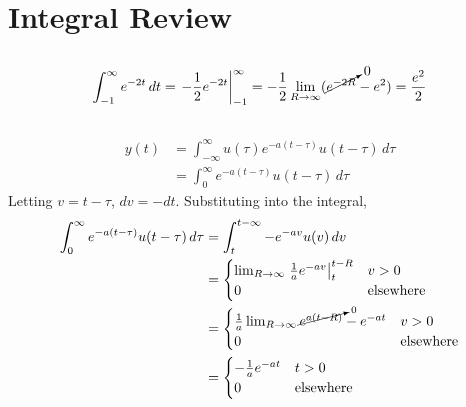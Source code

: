 \documentclass{article}
\begin{document}
\section{Integral Review}

\subsection{}

\begin{equation}
    \int_{-1}^\infty e^{-2t} \, dt = \left.-\frac{1}{2} e^{-2t}\right|_{-1}^\infty = -\frac{1}{2} \lim_{R \to \infty} (\cancelto{0}{e^{-2R}} - e^2) = \frac{e^2}{2}
\end{equation}

\subsection{}

\begin{align}
    y(t) &= \int_{-\infty}^\infty u(\tau) e^{-a (t - \tau)} u(t - \tau) \, d\tau \\
    &= \int_0^\infty e^{-a (t - \tau)} u(t - \tau) \, d\tau
\end{align}
Letting \(v = t - \tau\), \(dv = -dt\).
Substituting into the integral,
\begin{align}
    \int_0^\infty e^{-a (t - \tau)} u(t - \tau) \, d\tau &= \int_t^{t - \infty} -e^{-a v} u(v) \, dv \\
    &=
    \begin{cases}
        \lim_{R \to \infty} \left.\frac{1}{a} e^{-a v}\right|_t^{t - R} & v > 0 \\
        0 & \text{elsewhere}
    \end{cases} \\
    &=
    \begin{cases}
        \frac{1}{a} \lim_{R \to \infty} \cancelto{0}{e^{a (t - R)}} - e^{-a t} & v > 0 \\
        0 & \text{elsewhere}
    \end{cases} \\
    &=
    \begin{cases}
        -\frac{1}{a} e^{-a t} & t > 0 \\
        0 & \text{elsewhere}
    \end{cases}
\end{align}


\subsection{}
\end{document}

